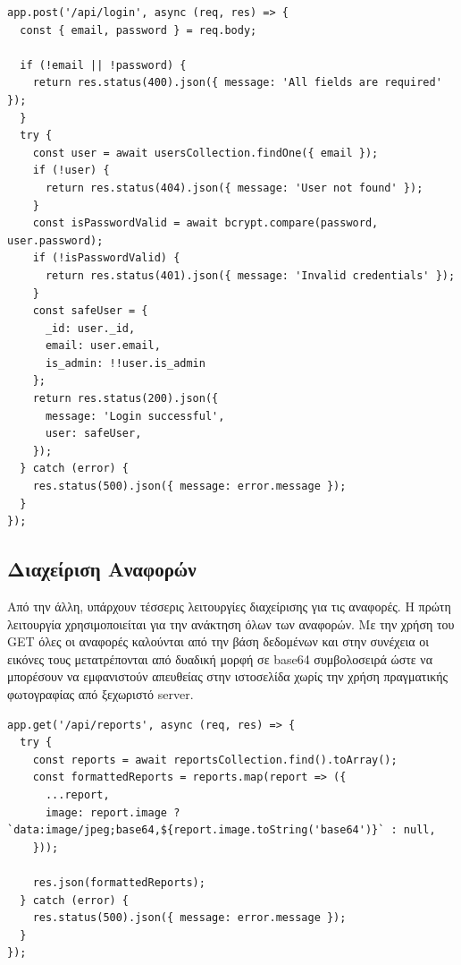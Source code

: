 \begin{lstlisting}
app.post('/api/login', async (req, res) => {
  const { email, password } = req.body;

  if (!email || !password) {
    return res.status(400).json({ message: 'All fields are required' });
  }
  try {
    const user = await usersCollection.findOne({ email });
    if (!user) {
      return res.status(404).json({ message: 'User not found' });
    }
    const isPasswordValid = await bcrypt.compare(password, user.password);
    if (!isPasswordValid) {
      return res.status(401).json({ message: 'Invalid credentials' });
    }
    const safeUser = {
      _id: user._id,
      email: user.email,
      is_admin: !!user.is_admin
    };
    return res.status(200).json({
      message: 'Login successful',
      user: safeUser,
    });
  } catch (error) {
    res.status(500).json({ message: error.message });
  }
});
\end{lstlisting}

\subsection{Διαχείριση Αναφορών}
Από την άλλη, υπάρχουν τέσσερις λειτουργίες διαχείρισης για τις αναφορές. Η πρώτη λειτουργία χρησιμοποιείται για την ανάκτηση όλων των αναφορών. Με την χρήση του GET όλες οι αναφορές καλούνται από την βάση δεδομένων και στην συνέχεια οι εικόνες τους μετατρέπονται από δυαδική μορφή σε base64 συμβολοσειρά ώστε να μπορέσουν να εμφανιστούν απευθείας στην ιστοσελίδα χωρίς την χρήση πραγματικής φωτογραφίας από ξεχωριστό server. 
\newpage
\begin{lstlisting}
app.get('/api/reports', async (req, res) => {
  try {
    const reports = await reportsCollection.find().toArray();
    const formattedReports = reports.map(report => ({
      ...report,
      image: report.image ? `data:image/jpeg;base64,${report.image.toString('base64')}` : null,
    }));

    res.json(formattedReports);
  } catch (error) {
    res.status(500).json({ message: error.message });
  }
});
\end{lstlisting}

